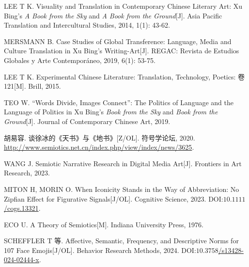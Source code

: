 \documentclass[12pt,a4paper,UTF8,fontset=founder]{ctexart}
\newlength{\csllabelwidth}
\newenvironment{CSLReferences}[2]%
  {\begin{list}{}{%
    \setlength{\leftmargin}{0pt}%
    \setlength{\itemindent}{0pt}%
    \setlength{\itemsep}{0pt}%
    \setlength{\parsep}{0pt}%
    \setlength{\listparindent}{\parindent}%
    \setlength{\topsep}{0pt}}}%
  {\end{list}}
\newcommand{\CSLLeftMargin}[1]{%
  \leavevmode\par\noindent
  \makebox[\csllabelwidth][l]{#1}%
  \hspace{0pt}}
\newcommand{\CSLRightInline}[1]{%
  \parbox[t]{\dimexpr\linewidth-\csllabelwidth\relax}{#1}}
\begin{document}
\protect{}\label{refs}
\begin{CSLReferences}{0}{0}
\CSLLeftMargin{{[}1{]} }%
\CSLRightInline{LEE T K. Visuality and Translation in Contemporary Chinese Literary Art: {Xu Bing's} \emph{A Book from the Sky} and \emph{A Book from the Ground}{[}J{]}. Asia Pacific Translation and Intercultural Studies, 2014, 1(1): 43-62.}

\CSLLeftMargin{{[}2{]} }%
\CSLRightInline{MERSMANN B. Case Studies of Global Transference: {Language}, Media and Culture Translation in {Xu Bing's} Writing-Art{[}J{]}. REGAC: Revista de Estudios Globales y Arte Contemporáneo, 2019, 6(1): 53-75.}

\CSLLeftMargin{{[}3{]} }%
\CSLRightInline{LEE T K. Experimental Chinese Literature: Translation, Technology, Poetics: 卷 121{[}M{]}. Brill, 2015.}

\CSLLeftMargin{{[}4{]} }%
\CSLRightInline{TEO W. {``{Words Divide, Images Connect}''}: {The} Politics of Language and the Language of Politics in {Xu Bing's} \emph{Book from the Sky} and \emph{Book from the Ground}{[}J{]}. Journal of Contemporary Chinese Art, 2019.}

\CSLLeftMargin{{[}5{]} }%
\CSLRightInline{胡易容. 谈徐冰的《天书》与《地书》{[}Z/OL{]}. 符号学论坛, 2020. \url{http://www.semiotics.net.cn/index.php/view/index/news/3625}.}

\CSLLeftMargin{{[}6{]} }%
\CSLRightInline{WANG J. Semiotic Narrative Research in Digital Media Art{[}J{]}. Frontiers in Art Research, 2023.}

\CSLLeftMargin{{[}7{]} }%
\CSLRightInline{MITON H, MORIN O. When Iconicity Stands in the Way of Abbreviation: {No} Zipfian Effect for Figurative Signals{[}J/OL{]}. Cognitive Science, 2023. DOI:\href{https://doi.org/$10.1111$/cogs.13321}{$10.1111$/cogs.13321}.}

\CSLLeftMargin{{[}8{]} }%
\CSLRightInline{ECO U. A Theory of Semiotics{[}M{]}. Indiana University Press, 1976.}

\CSLLeftMargin{{[}9{]} }%
\CSLRightInline{{SCHEFFLER T 等}. Affective, Semantic, Frequency, and Descriptive Norms for 107 Face Emojis{[}J/OL{]}. Behavior Research Methods, 2024. DOI:\href{https://doi.org/$10.3758$/s13428-024-02444-x}{$10.3758$/s13428-024-02444-x}.}


\end{CSLReferences}
\end{document}
